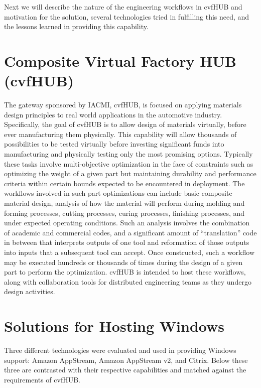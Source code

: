 \documentclass[conference]{../sty/IEEEtran}
\begin{document}
{Next we will describe the nature of the engineering workflows in cvfHUB and motivation for the solution, several technologies tried in fulfilling this need, and the lessons learned in providing this capability.





\section{Composite Virtual Factory HUB (cvfHUB)}

The gateway sponsored by IACMI, cvfHUB, is focused on applying materials design principles to real world applications in the automotive industry.  Specifically, the goal of cvfHUB is to allow design of materials virtually, before ever manufacturing them physically. This capability will allow thousands of possibilities to be tested virtually before investing significant funds into manufacturing and physically testing only the most promising options.  Typically these tasks involve multi-objective optimization in the face of constraints such as optimizing the weight of a given part but maintaining durability and performance criteria within certain bounds expected to be encountered in deployment.  The workflows involved in such part optimizations can include basic composite material design, analysis of how the material will perform during molding and forming processes, cutting processes, curing processes, finishing processes, and under expected operating conditions.  Such an analysis involves the combination of academic and commercial codes, and a significant amount of “translation” code in between that interprets outputs of one tool and reformation of those outputs into inputs that a subsequent tool can accept.  Once constructed, such a workflow may be executed hundreds or thousands of times during the design of a given part to perform the optimization.  cvfHUB is intended to host these workflows, along with collaboration tools for distributed engineering teams as they undergo design activities.



\section{Solutions for Hosting Windows}

Three different technologies were evaluated and used in providing Windows support: Amazon AppStream, Amazon AppStream v2, and Citrix.  Below these three are contrasted with their respective capabilities and matched against the requirements of cvfHUB.

}
\end{document}
